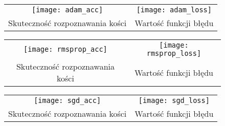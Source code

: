 \begin{figure}[h!]
\begin{center}
\begin{tabular}{cc}
\texttt{[image: adam\_acc]} &
\texttt{[image: adam\_loss]} \\
 Skuteczność rozpoznawania kości & Wartość funkcji błędu\\
\end{tabular}
\label{fig:comparison_adam}
\end{center}
\end{figure}

\begin{figure}[h!]
\begin{center}
\begin{tabular}{cc}
\texttt{[image: rmsprop\_acc]} &
\texttt{[image: rmsprop\_loss]} \\
 Skuteczność rozpoznawania kości & Wartość funkcji błędu\\
\end{tabular}
\label{fig:comparison_rmsprop}
\end{center}
\end{figure}

\begin{figure}[h!]
\begin{center}
\begin{tabular}{cc}
\texttt{[image: sgd\_acc]} &
\texttt{[image: sgd\_loss]} \\
 Skuteczność rozpoznawania kości & Wartość funkcji błędu\\
\end{tabular}
\label{fig:comparison_sgd}
\end{center}
\end{figure}
\newpage

